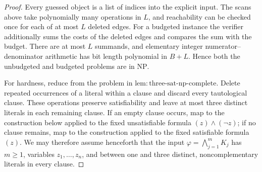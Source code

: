 \documentclass{article}
\begin{document}
\begin{proof}
Every guessed object is a list of indices into the explicit input.  The scans above take polynomially many operations in \(L\), and reachability can be checked once for each of at most \(L\) deleted edges.  For a budgeted instance the verifier additionally sums the costs of the deleted edges and compares the sum with the budget.  There are at most \(L\) summands, and elementary integer numerator--denominator arithmetic has bit length polynomial in \(B+L\).  Hence both the unbudgeted and budgeted problems are in \(\mathrm{NP}\).

For hardness, reduce from the problem in \(\mathrm{lem:three\mbox{-}sat\mbox{-}np\mbox{-}complete}\).  Delete repeated occurrences of a literal within a clause and discard every tautological clause.  These operations preserve satisfiability and leave at most three distinct literals in each remaining clause.  If an empty clause occurs, map to the construction below applied to the fixed unsatisfiable formula \((z)\wedge(\neg z)\); if no clause remains, map to the construction applied to the fixed satisfiable formula \((z)\).  We may therefore assume henceforth that the input \(\varphi=\bigwedge_{j=1}^m K_j\) has \(m\ge1\), variables \(z_1,\ldots,z_n\), and between one and three distinct, noncomplementary literals in every clause.


\end{proof}
\end{document}
